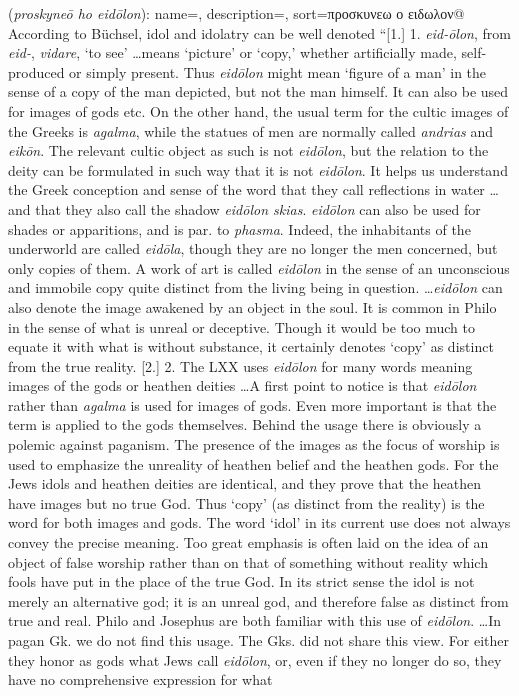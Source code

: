 \item[Idol worship,]

(\textit{proskyneō ho eidōlon}):
{
    name=,
    description={},
    sort=προσκυνεω ο ειδωλον@
}
According to Büchsel, idol and idolatry can be well denoted ``[1.] 1. \emph{eid-ōlon}, from \emph{eid-}, \emph{vidare}, `to see' \ldots means `picture' or `copy,' whether artificially made, self-produced or simply present. Thus \emph{eidōlon} might mean `figure of a man' in the sense of a copy of the man depicted, but not the man himself. It can also be used for images of gods etc. On the other hand, the usual term for the cultic images of the Greeks is \emph{agalma}, while the statues of men are normally called \emph{andrias} and \emph{eikōn}. The relevant cultic object as such is not \emph{eidōlon}, but the relation to the deity can be formulated in such way that it is  not \emph{eidōlon}. It helps us understand the Greek conception and sense of the word that they call reflections in water \ldots and that they also call the shadow \emph{eidōlon skias}. \emph{eidōlon} can also be used for shades or apparitions, and is par. to \emph{phasma}. Indeed, the inhabitants of the underworld are called \emph{eidōla}, though they are no longer the men concerned, but only copies of them. A work of art is called \emph{eidōlon} in the sense of an unconscious and immobile copy quite distinct from the living being in question. \ldots \emph{eidōlon} can also denote the image awakened by an object in the soul. It is common in Philo in the sense of what is unreal or deceptive. Though it would be too much to equate it with what is without substance, it certainly denotes `copy' as distinct from the true reality. [2.] 2. The LXX uses \emph{eidōlon} for many words meaning images of the gods or heathen deities \ldots A first point to notice is that \emph{eidōlon} rather than \emph{agalma} is used for images of gods. Even more important is that the term is applied to the gods themselves. Behind the usage there is obviously a polemic against paganism. The presence of the images as the focus of worship is used to emphasize the unreality of heathen belief and the heathen gods. For the Jews idols and heathen deities are identical, and they prove that the heathen have images but no true God. Thus `copy' (as distinct from the reality) is the word for both images and gods. The word `idol' in its current use does not always convey the precise meaning. Too great emphasis is often laid on the idea of an object of false worship rather than on that of something without reality which fools have put in the place of the true God. In its strict sense the idol is not merely an alternative god; it is an unreal god, and therefore false as distinct from true and real. Philo and Josephus are both familiar with this use of \emph{eidōlon}. \ldots In pagan Gk. we do not find this usage. The Gks. did not share this view. For either they honor as gods what Jews call \emph{eidōlon}, or, even if they no longer do so, they have no comprehensive expression for what 